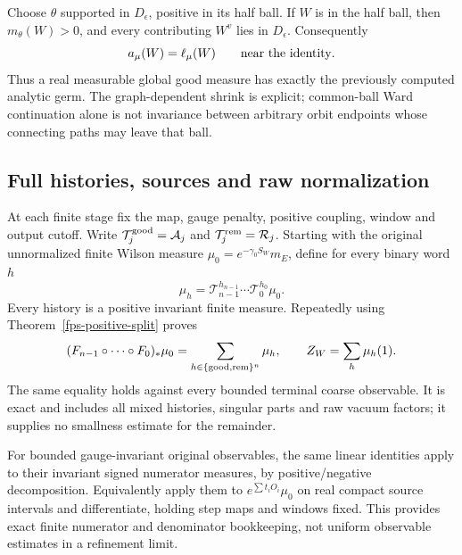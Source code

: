Choose \(\theta\) supported in \(D_\epsilon\),
positive in its half ball. If \(W\) is in the half ball, then
\(m_\theta(W)>0\), and every contributing \(W^v\) lies in
\(D_\epsilon\). Consequently
\begin{equation}
 a_\mu(W)=\ell_\mu(W)\qquad\hbox{near the identity}.
 \label{fps-germ-equality}
\end{equation}
Thus a real measurable global good measure has exactly the previously
computed analytic germ. The graph-dependent shrink is explicit;
common-ball Ward continuation alone is not invariance between arbitrary
orbit endpoints whose connecting paths may leave that ball.

\subsection{Full histories, sources and raw normalization}
\label{fps-histories-section}

At each finite stage fix the map, gauge penalty, positive coupling,
window and output cutoff. Write
\(\mathcal T_j^{\rm good}=\mathcal A_j\) and
\(\mathcal T_j^{\rm rem}=\mathcal R_j\).
Starting with the original unnormalized finite Wilson measure
\(\mu_0=e^{-\gamma_0S_W}m_E\), define for every binary word \(h\)
\[
 \mu_h=\mathcal T_{n-1}^{h_{n-1}}\cdots
                         \mathcal T_0^{h_0}\mu_0.
\]
Every history is a positive invariant finite measure. Repeatedly using
Theorem~\ref{fps-positive-split} proves
\begin{equation}
 (F_{n-1}\circ\cdots\circ F_0)_*\mu_0
     =\sum_{h\in\{{\rm good},{\rm rem}\}^n}\mu_h,
 \qquad Z_W=\sum_h\mu_h(1).
 \label{fps-history-identity}
\end{equation}
The same equality holds against every bounded terminal coarse
observable. It is exact and includes all mixed histories, singular
parts and raw vacuum factors; it supplies no smallness estimate for
the remainder.

For bounded gauge-invariant original observables, the same linear
identities apply to their invariant signed numerator measures, by
positive/negative decomposition. Equivalently apply them to
\(e^{\sum t_iO_i}\mu_0\) on real compact source intervals and
differentiate, holding step maps and windows fixed. This provides
exact finite numerator and denominator bookkeeping, not uniform
observable estimates in a refinement limit.

